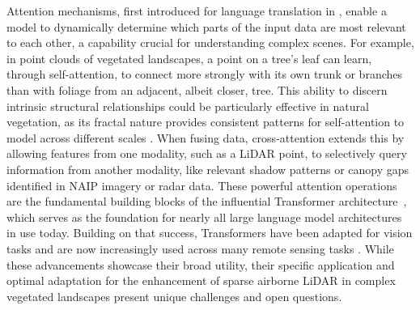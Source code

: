 \documentclass[12pt]{report}
\begin{document}
Attention mechanisms, first introduced for language translation in \citep{bahdanau2014neural}, enable a model to dynamically determine which parts of the input data are most relevant to each other, a capability crucial for understanding complex scenes. For example, in point clouds of vegetated landscapes, a point on a tree’s leaf can learn, through self-attention, to connect more strongly with its own trunk or branches than with foliage from an adjacent, albeit closer, tree. This ability to discern intrinsic structural relationships could be particularly effective in natural vegetation, as its fractal nature provides consistent patterns for self-attention to model across different scales \citep{scheuring1994application, yang2015extraction}. When fusing data, cross-attention extends this by allowing features from one modality, such as a LiDAR point, to selectively query information from another modality, like relevant shadow patterns or canopy gaps identified in NAIP imagery or radar data. These powerful attention operations are the fundamental building blocks of the influential Transformer architecture~\citep{vaswani2017attention}, which serves as the foundation for nearly all large language model architectures in use today. Building on that success, Transformers have been adapted for vision tasks \citep{dosovitskiy2020image} and are now increasingly used across many remote sensing tasks \citep{aleissaee2023transformers}. While these advancements showcase their broad utility, their specific application and optimal adaptation for the enhancement of sparse airborne LiDAR in complex vegetated landscapes present unique challenges and open questions.
\end{document}

